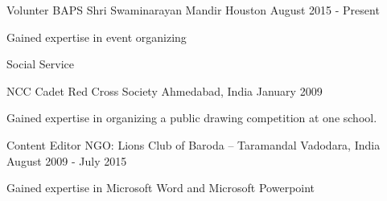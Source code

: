 \begin{cventries}
\cventry
	{Volunter} %
	{BAPS Shri Swaminarayan Mandir} %
	{Houston} %
	{August 2015 - Present} %
	{ %
		\begin{cvitems}
		\item {Gained expertise in event organizing}
		\item {Social Service}
		\end{cvitems}
	}
\end{cventries}
\begin{cventries}
\cventry
	{NCC Cadet} %
	{Red Cross Society} %
	{Ahmedabad, India} %
	{January 2009} %
	{ %
	\begin{cvitems}
		\item {Gained expertise in organizing a public drawing competition at one school.}
	\end{cvitems}
	}
\end{cventries}
\begin{cventries}
	\cventry
	{Content Editor} %
	{NGO: Lions Club of Baroda – Taramandal} %
	{Vadodara, India} %
	{August 2009 - July 2015} %
	{ %
		\begin{cvitems}
			\item {Gained expertise in Microsoft Word and Microsoft Powerpoint}
		\end{cvitems}
	}
\end{cventries}


